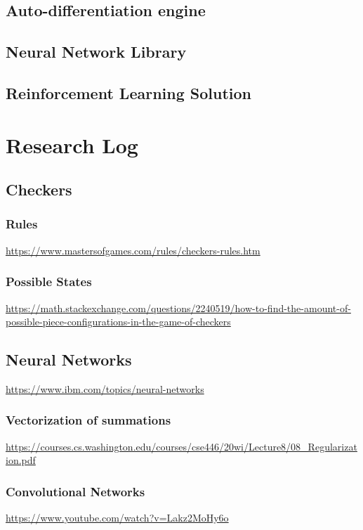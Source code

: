 \documentclass{article}
\begin{document}
    \subsection{Auto-differentiation engine}


    \subsection{Neural Network Library}


    \subsection{Reinforcement Learning Solution}





    \section{Research Log}

    \subsection{Checkers}
    \subsubsection{Rules}
    \noindent \url{https://www.mastersofgames.com/rules/checkers-rules.htm}
    \subsubsection{Possible States}
    \noindent \url{https://math.stackexchange.com/questions/2240519/how-to-find-the-amount-of-possible-piece-configurations-in-the-game-of-checkers}
    
    \subsection{Neural Networks}
    \noindent \url{https://www.ibm.com/topics/neural-networks}

    \subsubsection{Vectorization of summations}
    \noindent \url{https://courses.cs.washington.edu/courses/cse446/20wi/Lecture8/08_Regularization.pdf}

    \subsubsection{Convolutional Networks}
    \noindent \url{https://www.youtube.com/watch?v=Lakz2MoHy6o}\\
\end{document}
